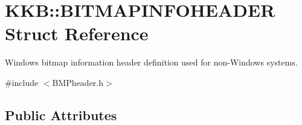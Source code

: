 \hypertarget{struct_k_k_b_1_1_b_i_t_m_a_p_i_n_f_o_h_e_a_d_e_r}{}\section{K\+KB\+:\+:B\+I\+T\+M\+A\+P\+I\+N\+F\+O\+H\+E\+A\+D\+ER Struct Reference}
\label{struct_k_k_b_1_1_b_i_t_m_a_p_i_n_f_o_h_e_a_d_e_r}


Windows bitmap information header definition used for non-\/\+Windows systems.  




{\ttfamily \#include $<$B\+M\+Pheader.\+h$>$}

\subsection*{Public Attributes}
